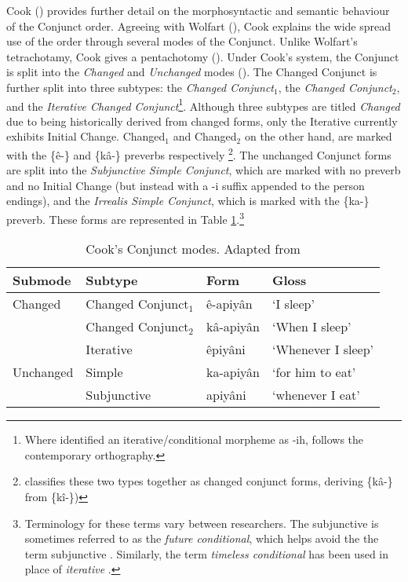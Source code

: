 Cook (\citeyear{Cook2014}) provides further detail on the morphosyntactic and semantic behaviour of the Conjunct order. Agreeing with Wolfart (\citeyear{Wolfart1973}), Cook explains the wide spread use of the order through several modes of the Conjunct. Unlike Wolfart's tetrachotamy, Cook gives a pentachotomy (\citeyear{Cook2014}). Under Cook's system, the Conjunct is split into the \textit{Changed} and \textit{Unchanged} modes (\citeyear{Cook2014}). The Changed Conjunct is further split into three subtypes: the \textit{Changed Conjunct}$_{1}$, the \textit{Changed Conjunct}$_{2}$, and the \textit{Iterative Changed Conjunct}\footnote{Where \citet{Wolfart1973} identified an iterative/conditional morpheme as {-ih}, \citet{Cook2014} follows the contemporary orthography.}. Although three subtypes are titled \textit{Changed} due to being historically derived from changed forms, only the Iterative currently exhibits Initial Change. Changed$_{1}$ and Changed$_{2}$ on the other hand, are marked with the \{\^{e}-\} and \{k\^{a}-\} preverbs respectively \footnote{\citet{Wolfart1973} classifies these two types together as changed conjunct forms, deriving \{k\^{a}-\} from \{k\^{i}-\})}. The unchanged Conjunct forms are split into the \textit{Subjunctive Simple Conjunct}, which are marked with no preverb and no Initial Change (but instead with a {-i} suffix appended to the person endings), and the \textit{Irrealis Simple Conjunct}, which is marked with the \{ka-\} preverb. These forms are represented in Table \ref{CookConjone}.\footnote{Terminology for these terms vary between researchers. The subjunctive is sometimes referred to as the \textit{future conditional}, which helps avoid the the term subjunctive \citep{Ratt2016,okimasis2018cree}. Similarly, the term \textit{timeless conditional} has been used in place of \textit{iterative} \citep{HarriganVAIPara}. }

\begin{table}
\centering
\begin{tabular}{llll} \\
\toprule
Submode   & Subtype     & Form    & Gloss    \\
\midrule
Changed   & Changed Conjunct$_{1}$    & \^{e}-apiy\^{a}n & `I sleep' \\
          & Changed Conjunct$_{2}$   & k\^{a}-apiy\^{a}n & `When I sleep' \\
          & Iterative   & \^{e}piy\^{a}ni  &  `Whenever I sleep' \\
Unchanged & Simple      & ka-apiy\^{a}n &  `for him to eat'\\
          & Subjunctive & apiy\^{a}ni  &  `whenever I eat'\\
\bottomrule
\end{tabular}
\caption{Cook's Conjunct modes. Adapted from \citet[125]{Cook2014}}
\label{CookConjone}
\end{table}
\FloatBarrier

